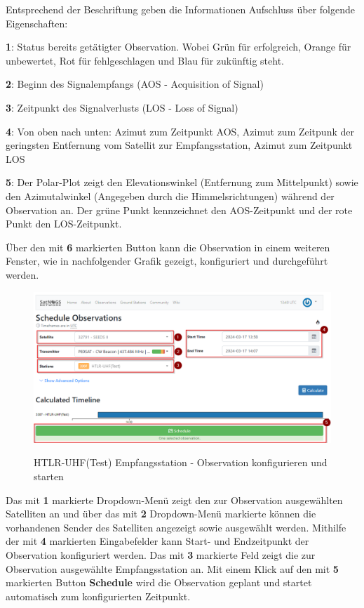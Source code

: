 Entsprechend der Beschriftung geben die Informationen Aufschluss über folgende Eigenschaften:

\textbf{1}: Status bereits getätigter Observation. Wobei Grün für erfolgreich, Orange für unbewertet, Rot für fehlgeschlagen und Blau für zukünftig steht.\newline

\textbf{2}: Beginn des Signalempfangs (AOS - Acquisition of Signal) \newline

\textbf{3}: Zeitpunkt des Signalverlusts (LOS - Loss of Signal) \newline

\textbf{4}: Von oben nach unten: Azimut zum Zeitpunkt AOS, Azimut zum Zeitpunk der geringsten Entfernung vom Satellit zur Empfangsstation, Azimut zum Zeitpunkt LOS \newline

\textbf{5}: Der Polar-Plot zeigt den Elevationswinkel (Entfernung zum Mittelpunkt) sowie den Azimutalwinkel (Angegeben durch die Himmelsrichtungen) während der Observation an. Der grüne Punkt kennzeichnet den AOS-Zeitpunkt und der rote Punkt den LOS-Zeitpunkt.

Über den mit \textbf{6} markierten Button kann die Observation in einem weiteren Fenster, wie in nachfolgender Grafik gezeigt, konfiguriert und durchgeführt werden.

\begin{figure} [H]
	\centering
	\includegraphics[width=\linewidth]{../ref/schedule_observation_schedule.png}
	\caption{HTLR-UHF(Test) Empfangsstation - Observation konfigurieren und starten} \cite{noauthor_satnogs_nodate}
	\label{fig:htrl-uhf(test)configureobservation}
\end{figure}

Das mit \textbf{1} markierte Dropdown-Menü zeigt den zur Observation ausgewählten Satelliten an und über das mit \textbf{2} Dropdown-Menü markierte können die vorhandenen Sender des Satelliten angezeigt sowie ausgewählt werden. Mithilfe der mit \textbf{4} markierten Eingabefelder kann Start- und Endzeitpunkt der Observation konfiguriert werden. Das mit \textbf{3} markierte Feld zeigt die zur Observation ausgewählte Empfangsstation an. Mit einem Klick auf den mit \textbf{5} markierten Button \textbf{Schedule} wird die Observation geplant und startet automatisch zum konfigurierten Zeitpunkt.

